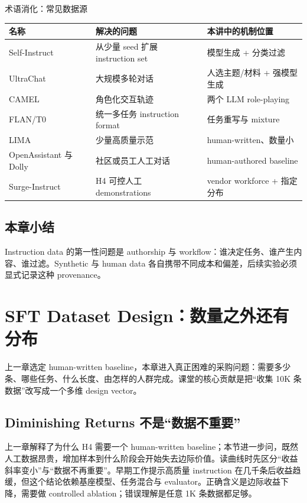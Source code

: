\documentclass[a4paper]{article}
\begin{document}
\begin{knowledgebox}{术语消化：常见数据源}
\begin{tabularx}{\textwidth}{@{}L{0.18\textwidth}L{0.25\textwidth}X@{}}
\toprule
名称 & 解决的问题 & 本讲中的机制位置 \\
\midrule
Self-Instruct & 从少量 seed 扩展 instruction set & 模型生成 + 分类过滤 \\
UltraChat & 大规模多轮对话 & 人选主题/材料 + 强模型生成 \\
CAMEL & 角色化交互轨迹 & 两个 LLM role-playing \\
FLAN/T0 & 统一多任务 instruction format & 任务重写与 mixture \\
LIMA & 少量高质量示范 & human-written、数量小 \\
OpenAssistant 与 Dolly & 社区或员工人工对话 & human-authored baseline \\
Surge-Instruct & H4 可控人工 demonstrations & vendor workforce + 指定分布 \\
\bottomrule
\end{tabularx}
\end{knowledgebox}

\subsection{本章小结}

Instruction data 的第一性问题是 authorship 与 workflow：谁决定任务、谁产生内容、谁过滤。Synthetic 与 human data 各自携带不同成本和偏差，后续实验必须显式记录这种 provenance。

\section{SFT Dataset Design：数量之外还有分布}

上一章选定 human-written baseline，本章进入真正困难的采购问题：需要多少条、哪些任务、什么长度、由怎样的人群完成。课堂的核心贡献是把“收集 10K 条数据”改写成一个多维 design vector。

\subsection{Diminishing Returns 不是“数据不重要”}

上一章解释了为什么 H4 需要一个 human-written baseline；本节进一步问，既然人工数据昂贵，增加样本到什么阶段会开始失去边际价值。读曲线时先区分“收益斜率变小”与“数据不再重要”。早期工作提示高质量 instruction 在几千条后收益趋缓，但这个结论依赖基座模型、任务混合与 evaluator。正确含义是边际收益下降，需要做 controlled ablation；错误理解是任意 1K 条数据都足够。
\end{document}
